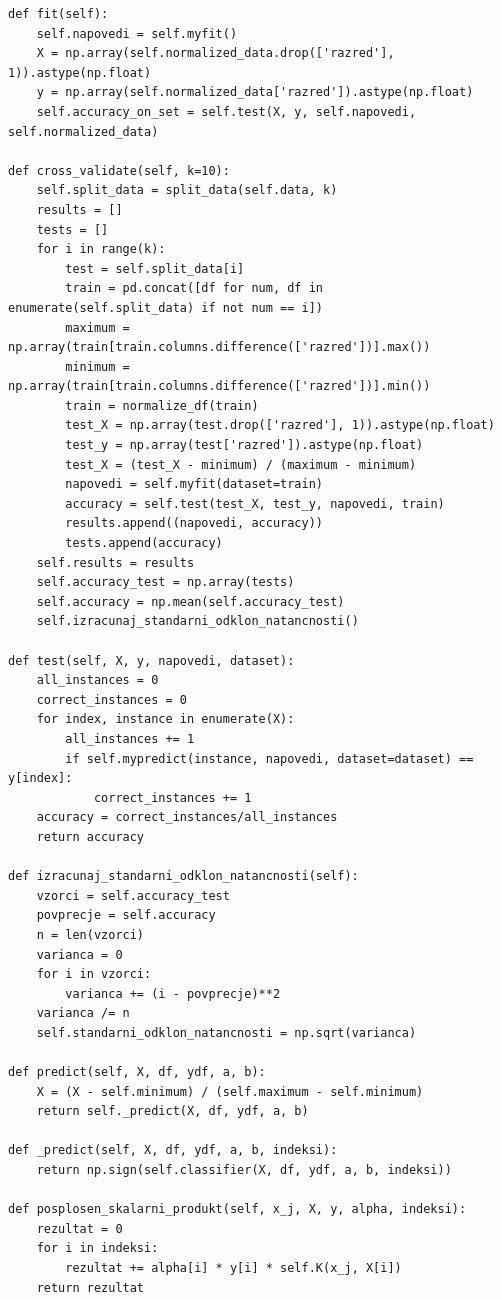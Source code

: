 \documentclass[mat1]{fmfdelo}
\begin{document}
\begin{scriptsize}
\begin{verbatim}
def fit(self):
    self.napovedi = self.myfit()
    X = np.array(self.normalized_data.drop(['razred'], 1)).astype(np.float)
    y = np.array(self.normalized_data['razred']).astype(np.float)
    self.accuracy_on_set = self.test(X, y, self.napovedi, self.normalized_data)

def cross_validate(self, k=10):
    self.split_data = split_data(self.data, k)
    results = []
    tests = []
    for i in range(k):
        test = self.split_data[i]
        train = pd.concat([df for num, df in enumerate(self.split_data) if not num == i])
        maximum = np.array(train[train.columns.difference(['razred'])].max())
        minimum = np.array(train[train.columns.difference(['razred'])].min())
        train = normalize_df(train)
        test_X = np.array(test.drop(['razred'], 1)).astype(np.float)
        test_y = np.array(test['razred']).astype(np.float)
        test_X = (test_X - minimum) / (maximum - minimum)
        napovedi = self.myfit(dataset=train)
        accuracy = self.test(test_X, test_y, napovedi, train)
        results.append((napovedi, accuracy))
        tests.append(accuracy)
    self.results = results
    self.accuracy_test = np.array(tests)
    self.accuracy = np.mean(self.accuracy_test)
    self.izracunaj_standarni_odklon_natancnosti()
       
def test(self, X, y, napovedi, dataset):
    all_instances = 0
    correct_instances = 0
    for index, instance in enumerate(X):
        all_instances += 1
        if self.mypredict(instance, napovedi, dataset=dataset) == y[index]:
            correct_instances += 1
    accuracy = correct_instances/all_instances
    return accuracy

def izracunaj_standarni_odklon_natancnosti(self):
    vzorci = self.accuracy_test
    povprecje = self.accuracy
    n = len(vzorci)
    varianca = 0
    for i in vzorci:
        varianca += (i - povprecje)**2
    varianca /= n
    self.standarni_odklon_natancnosti = np.sqrt(varianca)
      
def predict(self, X, df, ydf, a, b):
    X = (X - self.minimum) / (self.maximum - self.minimum)
    return self._predict(X, df, ydf, a, b)

def _predict(self, X, df, ydf, a, b, indeksi):
    return np.sign(self.classifier(X, df, ydf, a, b, indeksi))

def posplosen_skalarni_produkt(self, x_j, X, y, alpha, indeksi):
    rezultat = 0
    for i in indeksi: 
        rezultat += alpha[i] * y[i] * self.K(x_j, X[i])
    return rezultat
    

\end{verbatim}
\end{scriptsize}
\end{document}
